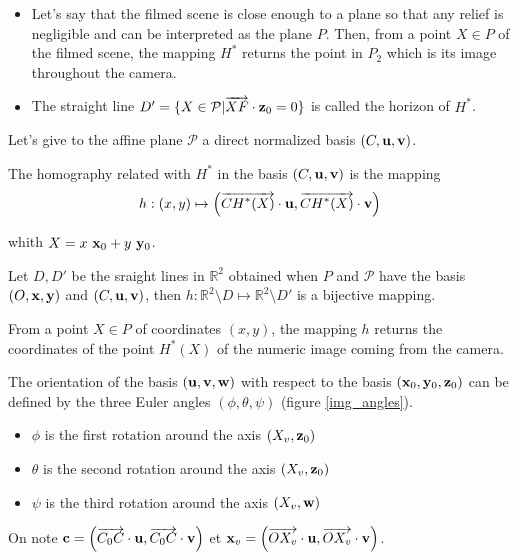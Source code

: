 \begin{remarques}
\begin{itemize}
\item Let's say that the filmed scene is close enough to a plane so that any relief is negligible and can be interpreted as the plane $P$. Then, from a point $X\in P$ of the filmed scene, the mapping $H^*$ returns the point in $P_2$ which is its image throughout the camera.
\item The straight line $D'=\{ X \in \mathcal{P} | \overrightarrow{XF} \cdot \mathbf{z}_0 =0 \}$ is called the horizon of $H^*$.
\end{itemize}

\end{remarques}
Let's give to the affine plane $\mathcal{P}$ a direct normalized basis $(C,\mathbf{u},\mathbf{v})$. 
\begin{Def}
 The homography related with $H^*$ in the basis $(C,\mathbf{u},\mathbf{v})$ is the mapping
\begin{equation}
h : (x,y)  \mapsto \left( \overrightarrow{CH^*(X)}\cdot \mathbf{u} , \overrightarrow{CH^*(X)}\cdot \mathbf{v} \right)
\label{formule_homographie_H}
\end{equation}


whith $X=x~\mathbf{x}_0 + y~\mathbf{y}_0 $.
\label{def_homographie_H}
\end{Def}
Let $D,D'$ be the sraight lines in $\mathbb{R}^2$ obtained when $P$ and $\mathcal{P}$ have the basis $(O,\mathbf{x},\mathbf{y})$ and $(C,\mathbf{u},\mathbf{v})$, then $h:\mathbb{R}^2  \setminus D \mapsto \mathbb{R}^2  \setminus D'$ is a bijective mapping.
\begin{remarque}
From a point $X\in P$ of coordinates $(x,y)$, the mapping $h$ returns the coordinates of the point $H^*(X)$ of the numeric image coming from the camera. 
\end{remarque}
The orientation of the basis $(\mathbf{u},\mathbf{v},\mathbf{w})$ with respect to the basis $(\mathbf{x}_0,\mathbf{y}_0,\mathbf{z}_0)$ can be defined by the three Euler angles $(\phi , \theta ,\psi )$ (figure \ref{img_angles}).
\begin{itemize}
\item $\phi$ is the first rotation around the axis $(X_v ,\mathbf{z}_0)$
\item $\theta$ is the second rotation around the axis $(X_v , \mathbf{z}_0 )$
\item $\psi$ is the third rotation around the axis $(X_v , \mathbf{w} )$
\end{itemize}
On note $\mathbf{c}= \left (\overrightarrow{C_0 C}\cdot \mathbf{u} , \overrightarrow{C_0 C}\cdot \mathbf{v} \right)$ et $\mathbf{x}_v=\left( \overrightarrow{O X_v}\cdot \mathbf{u} , \overrightarrow{O X_v}\cdot \mathbf{v} \right )$.\\

